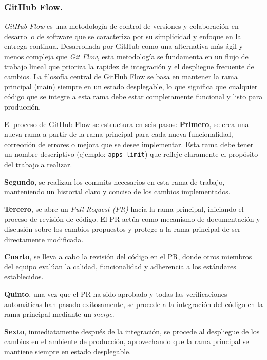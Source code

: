 \subsubsection{GitHub Flow.}

\textit{GitHub Flow} es una metodología de control de versiones y colaboración en desarrollo de software que se caracteriza por su simplicidad y enfoque en la entrega continua. Desarrollada por GitHub como una alternativa más ágil y menos compleja que \textit{Git Flow}, esta metodología se fundamenta en un flujo de trabajo lineal que prioriza la rapidez de integración y el despliegue frecuente de cambios. La filosofía central de GitHub Flow se basa en mantener la rama principal (main) siempre en un estado desplegable, lo que significa que cualquier código que se integre a esta rama debe estar completamente funcional y listo para producción.

El proceso de GitHub Flow se estructura en seis pasos: \textbf{Primero}, se crea una nueva rama a partir de la rama principal para cada nueva funcionalidad, corrección de errores o mejora que se desee implementar. Esta rama debe tener un nombre descriptivo (ejemplo: \texttt{apps-limit}) que refleje claramente el propósito del trabajo a realizar.

\textbf{Segundo}, se realizan los commits necesarios en esta rama de trabajo, manteniendo un historial claro y conciso de los cambios implementados.

\textbf{Tercero}, se abre un \textit{Pull Request (PR)} hacia la rama principal, iniciando el proceso de revisión de código. El PR actúa como mecanismo de documentación y discusión sobre los cambios propuestos y protege a la rama principal de ser directamente modificada.

\textbf{Cuarto}, se lleva a cabo la revisión del código en el PR, donde otros miembros del equipo evalúan la calidad, funcionalidad y adherencia a los estándares establecidos.

\textbf{Quinto}, una vez que el PR ha sido aprobado y todas las verificaciones automáticas han pasado exitosamente, se procede a la integración del código en la rama principal mediante un \textit{merge}.

\textbf{Sexto}, inmediatamente después de la integración, se procede al despliegue de los cambios en el ambiente de producción, aprovechando que la rama principal se mantiene siempre en estado desplegable.

